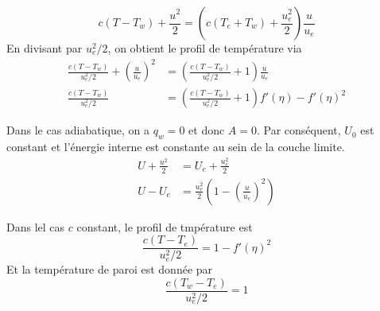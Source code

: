       \begin{equation}
        c(T-T_w) + \frac{u^2}{2} = \left(c(T_e + T_w) + \frac{u_e^2}{2}\right)\frac{u}{u_e}
      \end{equation}
      En divisant par $u_e^2/2$, on obtient le profil de température via
      \begin{equation}
        \begin{aligned}
          \frac{c(T-T_w)}{u_e^2/2} + \left(\frac{u}{u_e}\right)^2 &= \left(\frac{c(T-T_w)}{u_e^2/2} + 1\right) \frac{u}{u_e}\\
          \frac{c(T-T_w)}{u_e^2/2} &= \left(\frac{c(T-T_w)}{u_e^2/2} + 1\right) f'(\eta) - f'(\eta)^2
        \end{aligned}
      \end{equation}

      Dans le cas adiabatique, on a $q_w = 0$ et donc $A=0$. Par conséquent, $U_0$ est constant et l'énergie interne est constante au sein de la couche limite.
      \begin{equation}
        \begin{aligned}
          U + \frac{u^2}{2} &= U_e + \frac{u_e^2}{2} \\
          U - U_e &= \frac{u_e^2}{2} \left(1 - \left(\frac{u}{u_e}\right)^2\right)
        \end{aligned}
      \end{equation}

      Dans lel cas $c$ constant, le profil de tmpérature est
      \begin{equation}
        \frac{c(T-T_e)}{u_e^2/2} = 1 - f'(\eta)^2
      \end{equation}
      Et la température de paroi est donnée par
      \begin{equation}
        \frac{c(T_w - T_e)}{u_e^2/2} = 1
      \end{equation}
